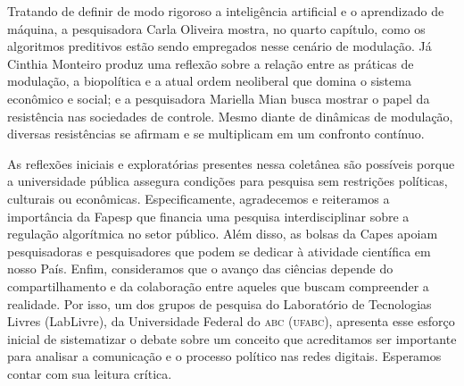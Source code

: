 Tratando de definir de modo rigoroso a inteligência artificial e o
aprendizado de máquina, a pesquisadora Carla Oliveira mostra, no quarto 
capítulo, como os algoritmos preditivos estão sendo empregados nesse
cenário de modulação. Já Cinthia Monteiro produz uma
reflexão sobre a relação entre as práticas de modulação, a biopolítica e
a atual ordem neoliberal que domina o sistema econômico e social; e a pesquisadora Mariella Mian busca mostrar o papel da
resistência nas sociedades de controle. Mesmo diante de dinâmicas de
modulação, diversas resistências se afirmam e se multiplicam em um
confronto contínuo.

As reflexões iniciais e exploratórias presentes nessa coletânea são
possíveis porque a universidade pública assegura condições para pesquisa
sem restrições políticas, culturais ou econômicas. Especificamente,
agradecemos e reiteramos a importância da Fapesp que financia uma
pesquisa interdisciplinar sobre a regulação algorítmica no setor
público. Além disso, as bolsas da Capes apoiam pesquisadoras e
pesquisadores que podem se dedicar à atividade científica em nosso País.
Enfim, consideramos que o avanço das ciências depende do
compartilhamento e da colaboração entre aqueles que buscam
compreender a realidade. Por isso, um dos grupos de pesquisa do
Laboratório de Tecnologias Livres (LabLivre), da Universidade Federal do \textsc{abc}
(\textsc{ufabc}), apresenta esse esforço inicial de sistematizar o debate sobre um
conceito que acreditamos ser importante para analisar a comunicação e o
processo político nas redes digitais. Esperamos contar com sua leitura
crítica.


